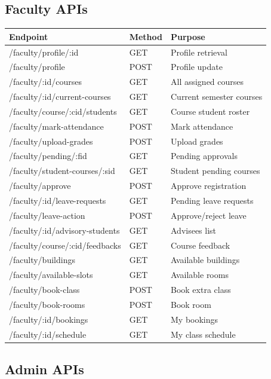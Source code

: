 \documentclass[12pt]{article}
\begin{document}
\subsection{Faculty APIs}

\begin{table}[H]
\centering
\small
\begin{tabular}{|p{4cm}|p{2cm}|p{5cm}|}
\hline
\textbf{Endpoint} & \textbf{Method} & \textbf{Purpose} \\
\hline
/faculty/profile/:id & GET & Profile retrieval \\
/faculty/profile & POST & Profile update \\
/faculty/:id/courses & GET & All assigned courses \\
/faculty/:id/current-courses & GET & Current semester courses \\
/faculty/course/:cid/students & GET & Course student roster \\
/faculty/mark-attendance & POST & Mark attendance \\
/faculty/upload-grades & POST & Upload grades \\
/faculty/pending/:fid & GET & Pending approvals \\
/faculty/student-courses/:sid & GET & Student pending courses \\
/faculty/approve & POST & Approve registration \\
/faculty/:id/leave-requests & GET & Pending leave requests \\
/faculty/leave-action & POST & Approve/reject leave \\
/faculty/:id/advisory-students & GET & Advisees list \\
/faculty/course/:cid/feedbacks & GET & Course feedback \\
/faculty/buildings & GET & Available buildings \\
/faculty/available-slots & GET & Available rooms \\
/faculty/book-class & POST & Book extra class \\
/faculty/book-rooms & POST & Book room \\
/faculty/:id/bookings & GET & My bookings \\
/faculty/:id/schedule & GET & My class schedule \\
\hline
\end{tabular}
\end{table}

\subsection{Admin APIs}
\end{document}
